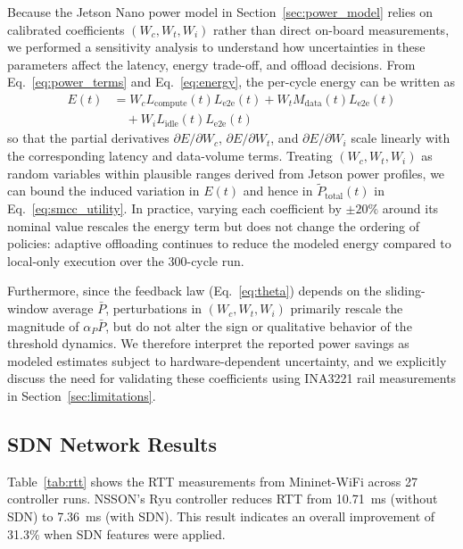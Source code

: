 \documentclass[journal]{IEEEtran}
\newcommand{\revblue}[1]{\textcolor{revblue}{#1}}
\begin{document}
\revblue{Because the Jetson Nano power model in
Section~\ref{sec:power_model} relies on calibrated coefficients
$(W_c,W_t,W_i)$ rather than direct on-board measurements, we performed a
sensitivity analysis to understand how uncertainties in these parameters
affect the latency, energy trade-off, and offload decisions. From
Eq.~\eqref{eq:power_terms} and Eq.~\eqref{eq:energy}, the per-cycle energy can be
written as
\begin{equation}
\begin{split}
E(t) &= W_c L_{\text{compute}}(t) L_{\text{e2e}}(t)
+ W_t M_{\text{data}}(t) L_{\text{e2e}}(t) \\
&\quad + W_i L_{\text{idle}}(t) L_{\text{e2e}}(t)
\end{split}
\end{equation}
so that the partial derivatives $\partial E/\partial W_c$,
$\partial E/\partial W_t$, and $\partial E/\partial W_i$ scale linearly
with the corresponding latency and data-volume terms. Treating
$(W_c,W_t,W_i)$ as random variables within plausible ranges derived from
Jetson power profiles, we can bound the induced variation in $E(t)$ and
hence in $\tilde{P}_{\text{total}}(t)$ in Eq.~\eqref{eq:smcc_utility}. In
practice, varying each coefficient by $\pm 20\%$ around its nominal value
rescales the energy term but does not change the ordering of policies:
adaptive offloading continues to reduce the modeled energy compared to
local-only execution over the 300-cycle run.}

\revblue{Furthermore, since the feedback law (Eq.~\eqref{eq:theta}) depends on
the sliding-window average $\bar{P}$, perturbations in
$(W_c,W_t,W_i)$ primarily rescale the magnitude of
$\alpha_P \bar{P}$, but do not alter the sign or qualitative behavior of
the threshold dynamics. We therefore interpret the reported power savings
as modeled estimates subject to hardware-dependent uncertainty, and we
explicitly discuss the need for validating these coefficients using
INA3221 rail measurements in Section~\ref{sec:limitations}.}

\subsection{SDN Network Results}

Table~\ref{tab:rtt} shows the RTT measurements from Mininet-WiFi across
27 controller runs. NSSON's Ryu controller reduces RTT from 10.71~ms (without SDN) to 7.36~ms (with SDN). This result indicates an overall improvement of 31.3\% when SDN features were applied.
\end{document}
